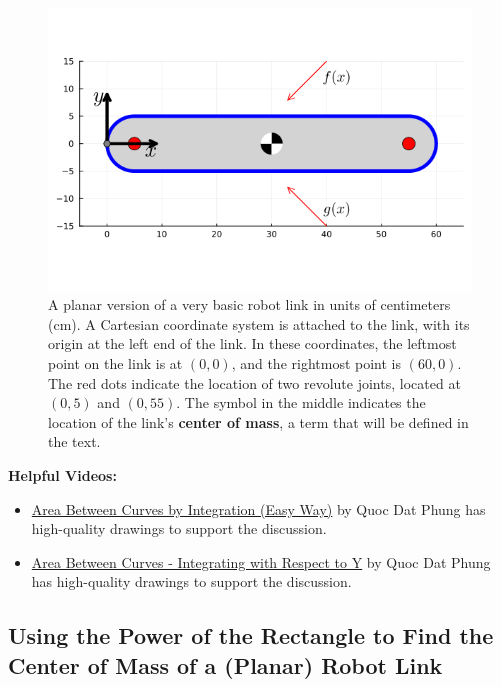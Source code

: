 \begin{figure}[htb]%
\centering
\includegraphics[width=0.6\columnwidth]{graphics/Chap03/basicRobtLink.png}%
    \caption[]{A planar version of a very basic robot link in units of centimeters (cm). A Cartesian coordinate system is attached to the link, with its origin at the left end of the link. In these coordinates, the leftmost point on the link is at $(0, 0)$, and the rightmost point is $(60, 0)$. The red dots indicate the location of two revolute joints, located at $(0, 5)$ and $(0, 55)$. The symbol in the middle indicates the location of the link's \textbf{center of mass}, a term that will be defined in the text.}
    \label{fig:basicRobtLink}
\end{figure}

\textbf{Helpful Videos:}
\begin{itemize}
    \item \href{https://youtu.be/FN6vXOs7J9s}{Area Between Curves by Integration (Easy Way)} by Quoc Dat Phung has high-quality drawings to support the discussion.

    \item \href{https://youtu.be/lQr6hpVPbUg?list=PLeTO6OT3-FKmuCeO97iKt_Aibx-a938JA}{Area Between Curves - Integrating with Respect to Y} by Quoc Dat Phung has high-quality drawings to support the discussion.
\end{itemize}


\subsection{Using the Power of the Rectangle to Find the Center of Mass of a (Planar) Robot Link}

